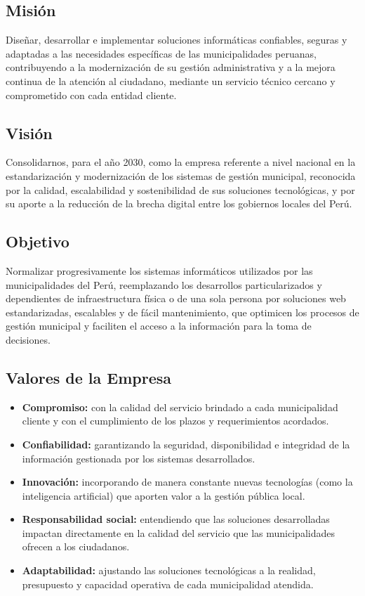 \documentclass[12pt,a4paper]{report}
\begin{document}
\subsection{Misión}
Diseñar, desarrollar e implementar soluciones informáticas confiables, seguras y adaptadas a las necesidades específicas de las municipalidades peruanas, contribuyendo a la modernización de su gestión administrativa y a la mejora continua de la atención al ciudadano, mediante un servicio técnico cercano y comprometido con cada entidad cliente.

\subsection{Visión}
Consolidarnos, para el año 2030, como la empresa referente a nivel nacional en la estandarización y modernización de los sistemas de gestión municipal, reconocida por la calidad, escalabilidad y sostenibilidad de sus soluciones tecnológicas, y por su aporte a la reducción de la brecha digital entre los gobiernos locales del Perú.

\subsection{Objetivo}
Normalizar progresivamente los sistemas informáticos utilizados por las municipalidades del Perú, reemplazando los desarrollos particularizados y dependientes de infraestructura física o de una sola persona por soluciones web estandarizadas, escalables y de fácil mantenimiento, que optimicen los procesos de gestión municipal y faciliten el acceso a la información para la toma de decisiones.

\subsection{Valores de la Empresa}

\begin{itemize}[leftmargin=1.25cm,itemsep=0pt,topsep=0pt]
  \item \textbf{Compromiso:} con la calidad del servicio brindado a cada municipalidad cliente y con el cumplimiento de los plazos y requerimientos acordados.
  \item \textbf{Confiabilidad:} garantizando la seguridad, disponibilidad e integridad de la información gestionada por los sistemas desarrollados.
  \item \textbf{Innovación:} incorporando de manera constante nuevas tecnologías (como la inteligencia artificial) que aporten valor a la gestión pública local.
  \item \textbf{Responsabilidad social:} entendiendo que las soluciones desarrolladas impactan directamente en la calidad del servicio que las municipalidades ofrecen a los ciudadanos.
  \item \textbf{Adaptabilidad:} ajustando las soluciones tecnológicas a la realidad, presupuesto y capacidad operativa de cada municipalidad atendida.
\end{itemize}
\end{document}
